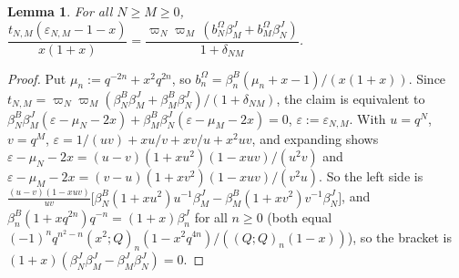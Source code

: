 \documentclass[11pt]{amsart}
\newtheorem{lemma}[theorem]{Lemma}
\theoremstyle{definition}
\numberwithin{equation}{section}
\begin{document}
\begin{lemma}\label{lem:factor}
For all $N\ge M\ge0$,
$\dfrac{t_{N,M}(\varepsilon_{N,M}-1-x)}{x(1+x)}=\dfrac{\varpi_N\varpi_M\,(b^\Omega_N\beta^J_M+b^\Omega_M\beta^J_N)}{1+\delta_{NM}}$.
\end{lemma}
\begin{proof}
Put $\mu_n:=q^{-2n}+x^2q^{2n}$, so $b^\Omega_n=\beta^B_n(\mu_n+x-1)/(x(1+x))$. Since
$t_{N,M}=\varpi_N\varpi_M(\beta^B_N\beta^J_M+\beta^B_M\beta^J_N)/(1+\delta_{NM})$, the claim is equivalent to
$\beta^B_N\beta^J_M(\varepsilon-\mu_N-2x)+\beta^B_M\beta^J_N(\varepsilon-\mu_M-2x)=0$, $\varepsilon:=\varepsilon_{N,M}$. With $u=q^N$, $v=q^M$,
$\varepsilon=1/(uv)+xu/v+xv/u+x^2uv$, and expanding shows $\varepsilon-\mu_N-2x=(u-v)(1+xu^2)(1-xuv)/(u^2v)$ and
$\varepsilon-\mu_M-2x=(v-u)(1+xv^2)(1-xuv)/(v^2u)$. So the left side is
$\frac{(u-v)(1-xuv)}{uv}\bigl[\beta^B_N(1+xu^2)u^{-1}\beta^J_M-\beta^B_M(1+xv^2)v^{-1}\beta^J_N\bigr]$, and
$\beta^B_n(1+xq^{2n})q^{-n}=(1+x)\beta^J_n$ for all $n\ge0$ (both equal
$(-1)^nq^{n^2-n}(x^2;Q)_n(1-x^2q^{4n})/((Q;Q)_n(1-x))$), so the bracket is $(1+x)(\beta^J_N\beta^J_M-\beta^J_M\beta^J_N)=0$.
\end{proof}
\end{document}
